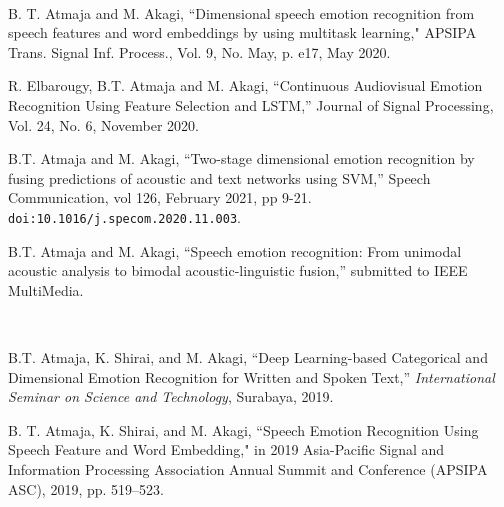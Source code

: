 

\renewcommand{\nomname}{PUBLICATIONS}
\markboth{\nomname}{\nomname}



\begin{publication}
\item[] \hspace{-1cm}{\LARGE\bf Journals} \\ 

\item 
B. T. Atmaja and M. Akagi, ``Dimensional speech emotion recognition from speech
features and word embeddings by using multitask learning," APSIPA Trans. Signal
Inf. Process., Vol. 9, No. May, p. e17, May 2020.

\item
R. Elbarougy, B.T. Atmaja and M. Akagi, ``Continuous Audiovisual Emotion
Recognition Using Feature Selection and LSTM,'' Journal of Signal Processing,
Vol. 24, No. 6, November 2020. 

\item
B.T. Atmaja and M. Akagi, ``Two-stage dimensional emotion recognition by fusing
predictions of acoustic and text networks using SVM,'' Speech Communication,
vol 126, February 2021, pp 9-21.
\verb|doi:10.1016/j.specom.2020.11.003|. 

\item 
B.T. Atmaja and M. Akagi, ``Speech emotion recognition: From unimodal acoustic
analysis to bimodal acoustic-linguistic fusion,'' submitted to IEEE MultiMedia.
\\

\item[] \hspace{-1cm}{\LARGE\bf International Conferences} \\ 

\item 
B.T. Atmaja, K. Shirai, and M. Akagi, ``Deep Learning-based Categorical and
Dimensional Emotion Recognition for Written and Spoken Text,''
\textit{International Seminar on Science and Technology}, Surabaya, 2019.

\item 
B. T. Atmaja, K. Shirai, and M. Akagi, ``Speech Emotion Recognition Using
Speech Feature and Word Embedding," in 2019 Asia-Pacific Signal and Information
Processing Association Annual Summit and Conference (APSIPA ASC), 2019, pp.
519--523.


\end{publication}

